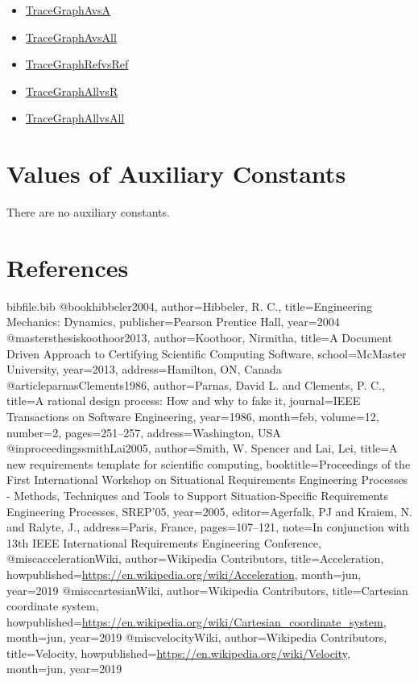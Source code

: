 \documentclass[12pt]{article}
\begin{document}
\begin{itemize}
\item{\hyperref{../../../../traceygraphs/sglpendulum/avsa.svg}{}{}{TraceGraphAvsA}}
\item{\hyperref{../../../../traceygraphs/sglpendulum/avsall.svg}{}{}{TraceGraphAvsAll}}
\item{\hyperref{../../../../traceygraphs/sglpendulum/refvsref.svg}{}{}{TraceGraphRefvsRef}}
\item{\hyperref{../../../../traceygraphs/sglpendulum/allvsr.svg}{}{}{TraceGraphAllvsR}}
\item{\hyperref{../../../../traceygraphs/sglpendulum/allvsall.svg}{}{}{TraceGraphAllvsAll}}
\end{itemize}
\section{Values of Auxiliary Constants}
\label{Sec:AuxConstants}
There are no auxiliary constants.

\section{References}
\label{Sec:References}
\begin{filecontents*}{bibfile.bib}
@book{hibbeler2004,
author={Hibbeler, R. C.},
title={Engineering Mechanics: Dynamics},
publisher={Pearson Prentice Hall},
year={2004}}
@mastersthesis{koothoor2013,
author={Koothoor, Nirmitha},
title={A Document Driven Approach to Certifying Scientific Computing Software},
school={McMaster University},
year={2013},
address={Hamilton, ON, Canada}}
@article{parnasClements1986,
author={Parnas, David L. and Clements, P. C.},
title={A rational design process: How and why to fake it},
journal={IEEE Transactions on Software Engineering},
year={1986},
month=feb,
volume={12},
number={2},
pages={251--257},
address={Washington, USA}}
@inproceedings{smithLai2005,
author={Smith, W. Spencer and Lai, Lei},
title={A new requirements template for scientific computing},
booktitle={Proceedings of the First International Workshop on Situational Requirements Engineering Processes - Methods, Techniques and Tools to Support Situation-Specific Requirements Engineering Processes, SREP'05},
year={2005},
editor={Agerfalk, PJ and Kraiem, N. and Ralyte, J.},
address={Paris, France},
pages={107--121},
note={In conjunction with 13th IEEE International Requirements Engineering Conference,}}
@misc{accelerationWiki,
author={Wikipedia Contributors},
title={Acceleration},
howpublished={\url{https://en.wikipedia.org/wiki/Acceleration}},
month=jun,
year={2019}}
@misc{cartesianWiki,
author={Wikipedia Contributors},
title={Cartesian coordinate system},
howpublished={\url{https://en.wikipedia.org/wiki/Cartesian\_coordinate\_system}},
month=jun,
year={2019}}
@misc{velocityWiki,
author={Wikipedia Contributors},
title={Velocity},
howpublished={\url{https://en.wikipedia.org/wiki/Velocity}},
month=jun,
year={2019}}
\end{filecontents*}
\nocite{*}
\printbibliography[heading=none]
\end{document}
